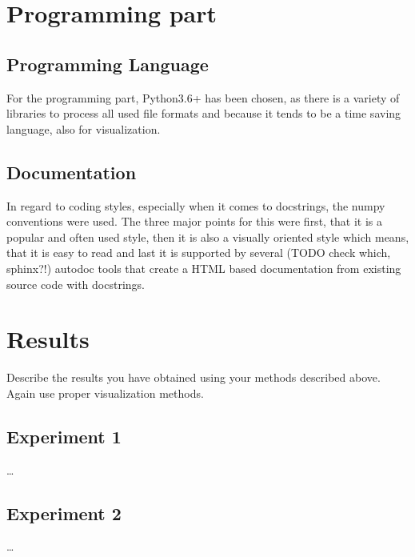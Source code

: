 \section{Programming part}

\subsection{Programming Language}

For the programming part, Python3.6+ has been chosen, as there is a variety of libraries to process all used file formats and because it tends to be a time saving language, also for visualization.\\

\subsection{Documentation}

In regard to coding styles, especially when it comes to docstrings, the numpy conventions were used. The three major points for this were first, that it is a popular and often used style, then it is also a visually oriented style which means, that it is easy to read and last it is supported by several (TODO check which, sphinx?!) autodoc tools that create a HTML based documentation from existing source code with docstrings.\\


\section{Results}

Describe the results you have obtained using your methods described above. Again use proper visualization methods.

\subsection{Experiment 1}

\dots

\subsection{Experiment 2}

\dots